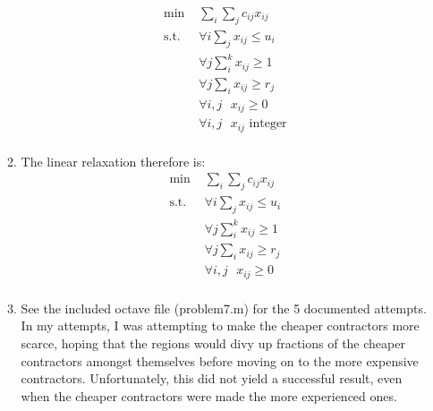 \documentclass[12pt]{article}
\begin{document}
\begin{enumerate}
\begin{enumerate}
        \begin{equation}
          \begin{split}
            \text{min } &\sum_{i}\sum_{j} c_{ij}x_{ij} \\
            \text{s.t. } &\forall i \sum_{j} x_{ij}\leq u_i \\
            & \forall j\sum_{i}^{k}x_{ij}\geq 1 \\
            & \forall j\sum_{i}x_{ij}\geq r_j \\
            & \forall i,j\text{ }x_{ij}\geq 0 \\
            & \forall i,j\text{ }x_{ij}\text{ integer} \\
          \end{split}
        \end{equation}
      \item
        The linear relaxation therefore is:\\
        \begin{equation}
          \begin{split}
            \text{min } &\sum_{i}\sum_{j} c_{ij}x_{ij} \\
            \text{s.t. } &\forall i \sum_{j} x_{ij}\leq u_i \\
            & \forall j\sum_{i}^{k}x_{ij}\geq 1 \\
            & \forall j\sum_{i}x_{ij}\geq r_j \\
            & \forall i,j\text{ }x_{ij}\geq 0 \\
          \end{split}
        \end{equation}
      \item
        See the included octave file (problem7.m) for the 5 documented attempts.
        In my attempts, I was attempting to make the cheaper contractors more
        scarce, hoping that the regions would divy up fractions of the cheaper
        contractors amongst themselves before moving on to the more expensive
        contractors. Unfortunately, this did not yield a successful result, even
        when the cheaper contractors were made the more experienced ones.
    \end{enumerate}
\end{enumerate}
\end{document}
